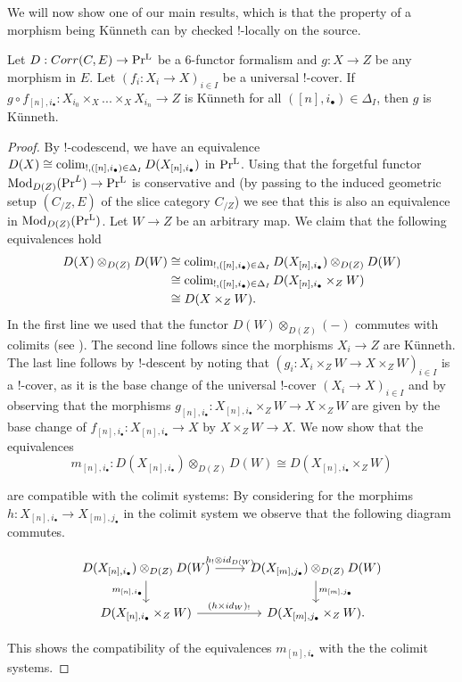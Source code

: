 We will now show one of our main results, which is that the property of a morphism being Künneth can by checked $!$-locally on the source. 
\begin{proposition}\label{dualisability is !-local on source}
Let $D : Corr(C,E) \to \operatorname{Pr^{L}}$ be a $6$-functor formalism and $g: X \to Z$ be any morphism in $E$. Let $(f_i: {X}_i\to X)_{i\in I}$ be a universal $!$-cover. If $g\circ f_{[n],i_\bullet} : X_{i_0}\times_X ... \times_X X_{i_n} \to Z$ is Künneth for all $([n],i_\bullet)\in \Delta_I$, then $g$ is Künneth.
\end{proposition}
\begin{proof}
By $!$-codescend, we have an equivalence $D(X)\cong \operatorname{colim}_{!,([n],i_\bullet)\in \Delta_I} D(X_{[n],i_\bullet})$ in $\operatorname{Pr^{L}}$. Using that the forgetful functor $\operatorname{Mod}_{D(Z)}(\Pr^L)\to \operatorname{Pr^{L}}$ is conservative and \Cite[Lemma 3.2.5]{heyer20246} (by passing to the induced geometric setup $(C_{/Z},E)$ of the slice category $C_{/Z}$) we see that this is also an equivalence in $\operatorname{Mod}_{D(Z)}(\operatorname{Pr^{L}})$. Let $W \to Z$ be an arbitrary map. We claim that the following equivalences hold
\begin{align*}
    D(X)\otimes_{D(Z)} D(W)& \cong \operatorname{colim}_{!,([n],i_\bullet)\in \Delta_I} D(X_{[n],i_\bullet})\otimes_{D(Z)}D(W) \\
    & \cong \operatorname{colim}_{!,([n],i_\bullet)\in \Delta_I}  D(X_{[n],i_\bullet} \times_Z W) \\
    & \cong  D(X\times_Z W).
\end{align*}
In the first line we used that the functor $D(W) \otimes_{D(Z)} (-)$ commutes with colimits (see ). The second line follows since the morphisms $X_i \to Z$ are Künneth. The last line follows by $!$-descent by noting that $(g_i :X_i\times_Z W \to X\times_Z W)_{i\in I}$ is a $!$-cover, as it is the base change of the universal $!$-cover $(X_i \to X)_{i\in I}$ and by observing that the morphisms $g_{[n],i_\bullet}: X_{[n],i_\bullet} \times_Z W \to X\times_Z W $ are given by the base change of $f_{[n],i_\bullet} : X_{[n],i_\bullet} \to X$ by $X\times_ZW \to X$. We now show that the equivalences 
\[
m_{{[n],i_\bullet}}: D(X_{[n],i_\bullet})\otimes_{D(Z)}D(W)\cong D(X_{[n],i_\bullet}\times_{Z}W)
\] 

are compatible with the colimit systems: By considering  for the morphims $h : X_{[n],i_\bullet} \to X_{[m],j_\bullet}$ in the colimit system we observe that the following diagram commutes.

\[\begin{tikzcd}
	{D(X_{[n],i_\bullet})\otimes_{D(Z)}D(W)} & {D(X_{[m],j_\bullet})\otimes_{D(Z)}D(W)} \\
	{D(X_{[n],i_\bullet}\times_Z W)} & {D(X_{[m],j_\bullet}\times_Z W).}
	\arrow["{h_{!}\otimes id_{D(W)}}", from=1-1, to=1-2]
	\arrow["{(h \times id_{W})_!}", from=2-1, to=2-2]
	\arrow["{m_{{[n],i_\bullet}}}"', from=1-1, to=2-1]
	\arrow["{m_{[m],j_\bullet}}", from=1-2, to=2-2]
\end{tikzcd}\]

This shows the compatibility of the equivalences $m_{{[n],i_\bullet}}$ with the the colimit systems. 
\end{proof}


